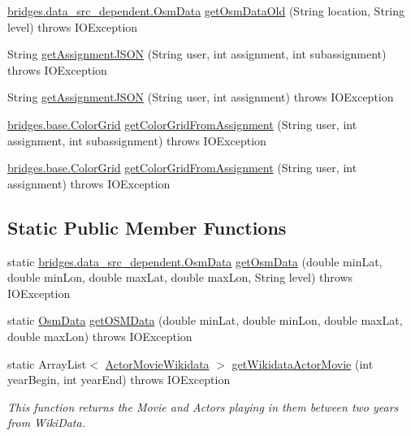 \begin{DoxyCompactItemize}
\item 
\hyperlink{classbridges_1_1data__src__dependent_1_1_osm_data}{bridges.\+data\+\_\+src\+\_\+dependent.\+Osm\+Data} \hyperlink{classbridges_1_1connect_1_1_data_source_aa6e921802c9cee6b7f87fe66f48bfec7}{get\+Osm\+Data\+Old} (String location, String level)  throws I\+O\+Exception 
\item 
String \hyperlink{classbridges_1_1connect_1_1_data_source_af2f6cd7172acb64b2ba49f134b5391f8}{get\+Assignment\+J\+S\+ON} (String user, int assignment, int subassignment)  throws I\+O\+Exception 
\item 
String \hyperlink{classbridges_1_1connect_1_1_data_source_af55c85da71b588f64ff4b46dbacab7f4}{get\+Assignment\+J\+S\+ON} (String user, int assignment)  throws I\+O\+Exception 
\item 
\hyperlink{classbridges_1_1base_1_1_color_grid}{bridges.\+base.\+Color\+Grid} \hyperlink{classbridges_1_1connect_1_1_data_source_a9556950d89b39ce61bead0879d1e2192}{get\+Color\+Grid\+From\+Assignment} (String user, int assignment, int subassignment)  throws I\+O\+Exception 
\item 
\hyperlink{classbridges_1_1base_1_1_color_grid}{bridges.\+base.\+Color\+Grid} \hyperlink{classbridges_1_1connect_1_1_data_source_ab715453b17503c73075f653326c09f44}{get\+Color\+Grid\+From\+Assignment} (String user, int assignment)  throws I\+O\+Exception 
\end{DoxyCompactItemize}
\subsection*{Static Public Member Functions}
\begin{DoxyCompactItemize}
\item 
static \hyperlink{classbridges_1_1data__src__dependent_1_1_osm_data}{bridges.\+data\+\_\+src\+\_\+dependent.\+Osm\+Data} \hyperlink{classbridges_1_1connect_1_1_data_source_a02158c0c41908db27fc4200bd9c096f4}{get\+Osm\+Data} (double min\+Lat, double min\+Lon, double max\+Lat, double max\+Lon, String level)  throws I\+O\+Exception 
\item 
static \hyperlink{classbridges_1_1data__src__dependent_1_1_osm_data}{Osm\+Data} \hyperlink{classbridges_1_1connect_1_1_data_source_a990d66ef06d1d771f86593a0a1b6e361}{get\+O\+S\+M\+Data} (double min\+Lat, double min\+Lon, double max\+Lat, double max\+Lon)  throws I\+O\+Exception 
\item 
static Array\+List$<$ \hyperlink{classbridges_1_1data__src__dependent_1_1_actor_movie_wikidata}{Actor\+Movie\+Wikidata} $>$ \hyperlink{classbridges_1_1connect_1_1_data_source_ad06946cc793bb990eeb3b9418ade1479}{get\+Wikidata\+Actor\+Movie} (int year\+Begin, int year\+End)  throws I\+O\+Exception 
\begin{DoxyCompactList}\small\item\em This function returns the Movie and Actors playing in them between two years from Wiki\+Data. \end{DoxyCompactList}\end{DoxyCompactItemize}


